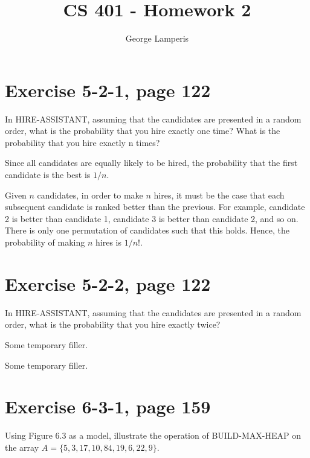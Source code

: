 \documentclass[letterpaper, 12pt, oneside]{memoir}
\title{CS 401 - Homework 2}
\author{George Lamperis}
\date{}
\begin{document}
\maketitle

\section*{Exercise 5-2-1, page 122}
In HIRE-ASSISTANT, assuming that the candidates are presented in a random order,
what is the probability that you hire exactly one time? What is the probability
that you hire exactly n times?


Since all candidates are equally likely to be hired, the probability that the
first candidate is the best is $1/n$.

Given $n$ candidates, in order to make $n$ hires, it must be the case that
each subsequent candidate is ranked better than the previous. For example, 
candidate 2 is better than candidate 1, candidate 3 is better than candidate 2,
and so on. There is only one permutation of candidates such that this holds. 
Hence, the probability of making $n$ hires is $1/n!$.

\section*{Exercise 5-2-2, page 122}
In HIRE-ASSISTANT, assuming that the candidates are presented in a random order,
what is the probability that you hire exactly twice?

Some temporary filler.

Some temporary filler.


\section*{Exercise 6-3-1, page 159}
Using Figure 6.3 as a model, illustrate the operation of BUILD-MAX-HEAP on the
array $A = \{5, 3, 17, 10, 84, 19, 6, 22, 9 \}$.
\end{document}
